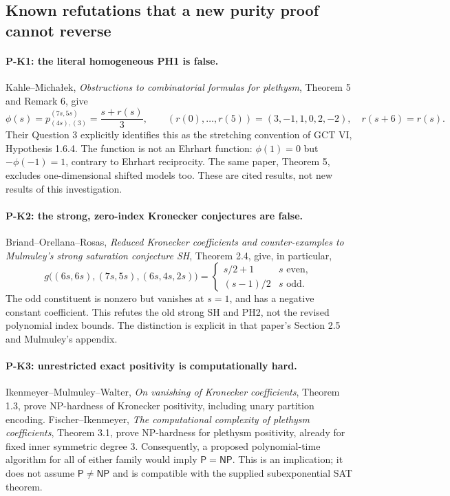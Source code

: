 \subsection{Known refutations that a new purity proof cannot reverse}
\paragraph{P-K1: the literal homogeneous PH1 is false.}
Kahle--Micha\l ek, \emph{Obstructions to combinatorial formulas for
plethysm}, Theorem 5 and Remark 6, give
\[
 \phi(s)=p_{(4s),(3)}^{(7s,5s)}
 =\frac{s+r(s)}3,\qquad
 (r(0),\ldots,r(5))=(3,-1,1,0,2,-2),
 \quad r(s+6)=r(s).
 \tag{P-K1}\label{eq:km}
\]
Their Question 3 explicitly identifies this as the stretching convention
of GCT VI, Hypothesis 1.6.4. The function is not an Ehrhart function:
$\phi(1)=0$ but $-\phi(-1)=1$, contrary to Ehrhart reciprocity.
The same paper, Theorem 5, excludes one-dimensional shifted models too.
These are cited results, not new results of this investigation.

\paragraph{P-K2: the strong, zero-index Kronecker conjectures are false.}
Briand--Orellana--Rosas, \emph{Reduced Kronecker coefficients and
counter-examples to Mulmuley's strong saturation conjecture SH},
Theorem 2.4, give, in particular,
\[
 g\bigl((6s,6s),(7s,5s),(6s,4s,2s)\bigr)
 =
 \begin{cases}s/2+1&s\text{ even},\\(s-1)/2&s\text{ odd}.\end{cases}
 \tag{P-K2}
\]
The odd constituent is nonzero but vanishes at $s=1$, and has a negative
constant coefficient. This refutes the old strong SH and PH2, not the
revised polynomial index bounds. The distinction is explicit in that
paper's Section 2.5 and Mulmuley's appendix.

\paragraph{P-K3: unrestricted exact positivity is computationally hard.}
Ikenmeyer--Mulmuley--Walter, \emph{On vanishing of Kronecker coefficients},
Theorem 1.3, prove NP-hardness of Kronecker positivity, including unary
partition encoding. Fischer--Ikenmeyer, \emph{The computational complexity
of plethysm coefficients}, Theorem 3.1, prove NP-hardness for plethysm
positivity, already for fixed inner symmetric degree $3$.
Consequently, a proposed polynomial-time algorithm for all of either
family would imply $\mathsf P=\mathsf{NP}$. This is an implication;
it does not assume $\mathsf P\ne\mathsf{NP}$ and is compatible with the
supplied subexponential SAT theorem.

